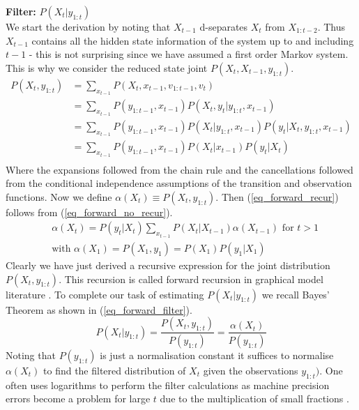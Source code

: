 \documentclass[../masters.tex]{subfiles}
\begin{document}
\textbf{Filter:} $P(X_t|y_{1:t})$\\
We start the derivation by noting that $X_{t-1}$ d-separates $X_t$ from $X_{1:t-2}$. Thus $X_{t-1}$ contains all the hidden state information of the system up to and including $t-1$ - this is not surprising since we have assumed a first order Markov system. This is why we consider the reduced state joint $P(X_t, X_{t-1},y_{1:t})$.
\begin{equation}
\begin{aligned}
P(X_t, y_{1:t}) &= \sum_{x_{t-1}} P(X_t, x_{t-1}, v_{1:t-1},v_t)\\
&= \sum_{x_{t-1}} P(y_{1:t-1}, x_{t-1})P(X_t, y_t|y_{1:t}, x_{t-1})\\  & = \sum_{x_{t-1}} P(y_{1:t-1}, x_{t-1})P(X_t|y_{1:t}, x_{t-1})P(y_t|X_t,y_{1:t}, x_{t-1}) \\
&= \sum_{x_{t-1}} P(y_{1:t-1}, x_{t-1})P(X_t|x_{t-1})P(y_t|X_t) \\
\end{aligned}
\label{eq_forward_no_recur}
\end{equation}
Where the expansions followed from the chain rule and the cancellations followed from the conditional independence assumptions of the transition and observation functions. Now we define $\alpha(X_t) \equiv P(X_t,y_{1:t})$. Then (\ref{eq_forward_recur}) follows from (\ref{eq_forward_no_recur}).
\begin{equation}
\begin{aligned}
&\alpha(X_t) = P(y_t|X_t)\sum_{x_{t-1}}P(X_t|X_{t-1})\alpha(X_{t-1}) \text{ for } t>1\\
&\text{with } \alpha(X_1) = P(X_1, y_1) = P(X_1)P(y_1|X_1)
\end{aligned}
\label{eq_forward_recur}
\end{equation}
Clearly we have just derived a recursive expression for the joint distribution $P(X_t, y_{1:t})$. This recursion is called forward recursion in graphical model literature \cite{barber}. To complete our task of estimating $P(X_t|y_{1:t})$ we recall Bayes' Theorem as shown in (\ref{eq_forward_filter}).
\begin{equation}
P(X_t|y_{1:t}) = \frac{P(X_t, y_{1:t})}{P(y_{1:t})} = \frac{\alpha(X_t)}{P(y_{1:t})}
\label{eq_forward_filter}
\end{equation}
Noting that $P(y_{1:t})$ is just a normalisation constant it suffices to normalise $\alpha(X_t)$ to find the filtered distribution of $X_t$ given the observations $y_{1:t})$. One often uses logarithms to perform the filter calculations as machine precision errors become a problem for large $t$ due to the multiplication of small fractions \cite{barber}.
\end{document}

